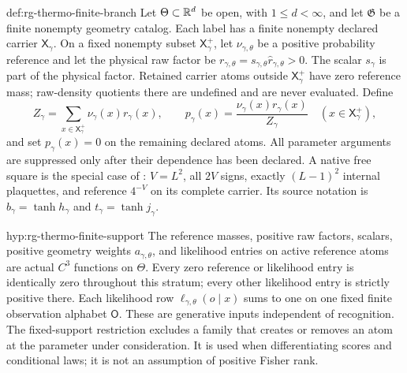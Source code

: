 {def:rg-thermo-finite-branch}
Let $\Theta\subset\mathbb R^d$ be open, with $1\leq d<\infty$, and let
$\mathfrak G$ be a finite nonempty geometry catalog. Each label has a
finite nonempty declared carrier $\mathsf X_\gamma$. On a fixed nonempty
subset $\mathsf X_\gamma^+$, let $\nu_{\gamma,\theta}$ be a positive
probability reference and let the physical raw factor be
$r_{\gamma,\theta}=s_{\gamma,\theta}\widehat r_{\gamma,\theta}>0$.
The scalar $s_\gamma$ is part of the physical factor. Retained carrier atoms
outside $\mathsf X_\gamma^+$ have zero reference mass; raw-density
quotients there are undefined and are never evaluated. Define
\begin{equation}
 Z_\gamma=\sum_{x\in\mathsf X_\gamma^+}\nu_\gamma(x)r_\gamma(x),
 \qquad
 p_\gamma(x)=\frac{\nu_\gamma(x)r_\gamma(x)}{Z_\gamma}
 \quad (x\in\mathsf X_\gamma^+),
 \label{eq:rg-thermo-finite-branch}
\end{equation}
and set $p_\gamma(x)=0$ on the remaining declared atoms. All parameter
arguments are suppressed only after their dependence has been declared.
A native free square is the special case of
: $V=L^2$, all $2V$ signs, exactly
$(L-1)^2$ internal plaquettes, and reference $4^{-V}$ on its complete
carrier. Its source notation is $b_\gamma=\tanh h_\gamma$ and
$t_\gamma=\tanh j_\gamma$. 

{hyp:rg-thermo-finite-support}
The reference masses, positive raw factors, scalars, positive geometry
weights $a_{\gamma,\theta}$, and likelihood entries on active reference atoms are actual $C^3$
functions on $\Theta$. Every zero reference or likelihood entry is
identically zero throughout this stratum; every other likelihood entry is
strictly positive there. Each likelihood row
$\ell_{\gamma,\theta}(o\mid x)$ sums to one on one fixed finite
observation alphabet $\mathsf O$. These are generative inputs independent
of recognition. The fixed-support restriction excludes a family that
creates or removes an atom at the parameter under consideration. It is
used when differentiating scores and conditional laws; it is not an
assumption of positive Fisher rank. 

